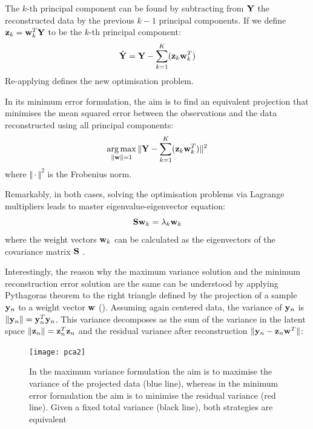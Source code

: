 The $k$-th principal component can be found by subtracting from ${\bf Y}$ the reconstructed data by the previous $k-1$ principal components. If we define ${\bf z}_k={\bf w}_k^T {\bf Y}$ to be the $k$-th principal component:
\[
	\hat{{\bf Y}} = {\bf Y} - \sum_{k=1}^{K} ({\bf z}_k {\bf w}_k^T)
\]
Re-applying  defines the new optimisation problem.

In its minimum error formulation, the aim is to find an equivalent projection that minimises the mean squared error between the observations and the data reconstructed using all principal components:
\[
	\operatorname*{arg\,max}_{\|{\bf w}\|=1} \Vert {\bf Y} - \sum_{k=1}^{K} ({\bf z}_k {\bf w}_k^T) \Vert^{2}
\]
where $\Vert \cdot \Vert^{2}$ is the Frobenius norm.

Remarkably, in both cases, solving the optimisation problems via Lagrange multipliers leads to master eigenvalue-eigenvector equation:
\begin{equation}
	{\bf S} {\bf w}_k = \lambda_k {\bf w}_k
\end{equation}
where the weight vectors ${\bf w}_k$ can be calculated as the eigenvectors of the covariance matrix ${\bf S}$ \cite{Bishop2006}.

Interestingly, the reason why the maximum variance solution and the minimum reconstruction error solution are the same can be understood by applying Pythagoras theorem to the right triangle defined by the projection of a sample ${\bf y}_{n}$ to a weight vector ${\bf w}$ ().
Assuming again centered data, the variance of ${\bf y}_{n}$ is $\|{\bf y}_{n}\| = {\bf y}_{n}^T {\bf y}_{n}$. This variance decomposes as the sum of the variance in the latent space $\|{\bf z}_{n}\| = {\bf z}_{n}^T {\bf z}_{n}$ and the residual variance after reconstruction $\|{\bf y}_{n} - {\bf z}_{n} {\bf w}^T \|$:

\begin{figure}[H]
	\centering
	\texttt{[image: pca2]}
	\caption[Maximizing the variance in the principal component space is equivalent to minimizing the data reconstruction error]{In the maximum variance formulation the aim is to maximise the variance of the projected data (blue line), whereas in the minimum error formulation the aim is to minimise the residual variance (red line). Given a fixed total variance (black line), both strategies are equivalent}
	\label{fig:pca2}
\end{figure}

